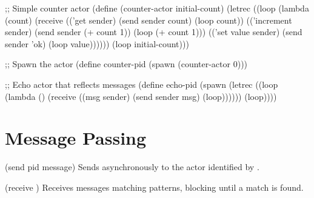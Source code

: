 \begin{example}
\begin{lambdustcode}
;; Simple counter actor
(define (counter-actor initial-count)
  (letrec ((loop (lambda (count)
                   (receive  
                     (('get sender)
                      (send sender count)
                      (loop count))
                     (('increment sender)
                      (send sender (+ count 1)) 
                      (loop (+ count 1)))
                     (('set value sender)
                      (send sender 'ok)
                      (loop value))))))
    (loop initial-count)))

;; Spawn the actor
(define counter-pid (spawn (counter-actor 0)))

;; Echo actor that reflects messages
(define echo-pid 
  (spawn 
    (letrec ((loop (lambda ()
                     (receive
                       ((msg sender)
                        (send sender msg) 
                        (loop))))))
      (loop))))
\end{lambdustcode}
\end{example}

\section{Message Passing}
\label{sec:message-passing}

\begin{syntaxspec}{(send pid message)}
Sends  asynchronously to the actor identified by .
\end{syntaxspec}

\begin{syntaxspec}{(receive )}
Receives messages matching patterns, blocking until a match is found.
\end{syntaxspec}

